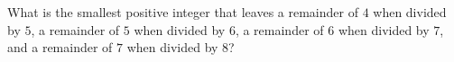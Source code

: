 What is the smallest positive integer that leaves a remainder of $4$ when divided by $5$, a remainder of $5$ when divided by $6$, a remainder of $6$ when divided by $7$, and a remainder of $7$ when divided by $8$?
